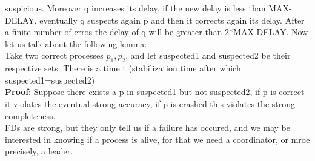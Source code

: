 \documentclass[11pt, a4paper]{article}
\begin{document}
 suspicious. Moreover q increases its delay, if the new delay is less than MAX-DELAY, eventually q suspects again p and then it corrects again its delay. After a finite number of erros the delay of q will be greater than 2*MAX-DELAY.
Now let us talk about the following lemma:\\
Take two correct processes $p_1,p_2$, and let suspected1 and suspected2 be their respective sets. There is a time t (stabilization time after which suspected1=suspected2)\\
\textbf{Proof}: Suppose there exists a p in suspected1 but not suspected2, if p is correct it violates the eventual strong accuracy, if p is crashed this violates the strong completeness.\\
FDs are strong, but they only tell us if a failure has occured, and we may be interested in knowing if a process is alive, for that we need a coordinator, or mroe precisely, a leader.\\
\end{document}
